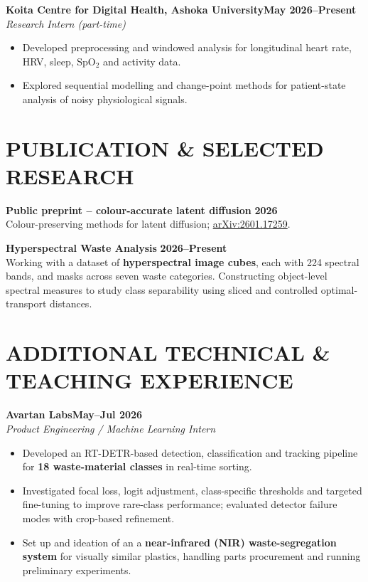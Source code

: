 \documentclass[10pt,a4paper]{article}
\newcommand{\entry}[3]{%
  \noindent\textbf{#1}\hfill\textbf{#3}\\[-1pt]
  \textit{#2}\par
}
\newenvironment{cvitems}{%
  \begin{itemize}[leftmargin=1.15em,label=\textbullet,itemsep=2.5pt,topsep=3pt,parsep=0pt,partopsep=0pt]
}{\end{itemize}}
\begin{document}
\entry{Koita Centre for Digital Health, Ashoka University}{Research Intern (part-time)}{May 2026--Present}
\begin{cvitems}
  \item Developed preprocessing and windowed analysis for longitudinal heart rate, HRV, sleep, SpO$_2$ and activity data.
  \item Explored sequential modelling and change-point methods for patient-state analysis of noisy physiological signals.
\end{cvitems}

\section{PUBLICATION \& SELECTED RESEARCH}
\noindent\textbf{Public preprint -- colour-accurate latent diffusion} \hfill \textbf{2026}\\[-1pt]
Colour-preserving methods for latent diffusion; \href{https://arxiv.org/abs/2601.17259}{arXiv:2601.17259}.\par\vspace{3pt}
\noindent\textbf{Hyperspectral Waste Analysis} \hfill \textbf{2026--Present}\\[-1pt]
Working with a dataset of \textbf{hyperspectral image cubes}, each with 224 spectral bands, and masks across seven waste categories. Constructing object-level spectral measures to study class separability using sliced and controlled optimal-transport distances.

\section{ADDITIONAL TECHNICAL \& TEACHING EXPERIENCE}
\entry{Avartan Labs}{Product Engineering / Machine Learning Intern}{May--Jul 2026}
\begin{cvitems}
  \item Developed an RT-DETR-based detection, classification and tracking pipeline for \textbf{18 waste-material classes} in real-time sorting.
  \item Investigated focal loss, logit adjustment, class-specific thresholds and targeted fine-tuning to improve rare-class performance; evaluated detector failure modes with crop-based refinement.
  \item Set up and ideation of an a \textbf{near-infrared (NIR) waste-segregation system} for visually similar plastics, handling parts procurement and running preliminary experiments.
\end{cvitems}
\end{document}
